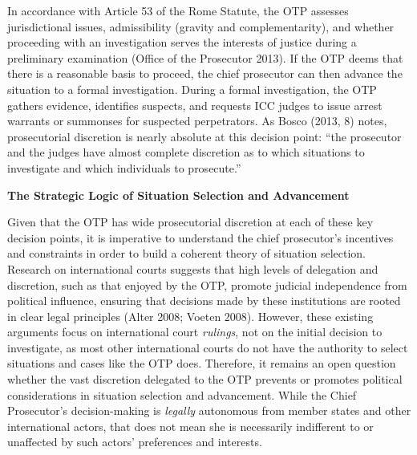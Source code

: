 In accordance with Article 53 of the Rome Statute, the OTP assesses jurisdictional issues, admissibility (gravity and complementarity), and whether proceeding with an investigation serves the interests of justice during a preliminary examination (Office of the Prosecutor 2013). If the OTP deems that there is a reasonable basis to proceed, the chief prosecutor can then advance the situation to a formal investigation. During a formal investigation, the OTP gathers evidence, identifies suspects, and requests ICC judges to issue arrest warrants or summonses for suspected perpetrators. As Bosco (2013, 8) notes, prosecutorial discretion is nearly absolute at this decision point: ``the prosecutor and the judges have almost complete discretion as to which situations to investigate and which individuals to prosecute.''

\textbf{The Strategic Logic of Situation Selection and Advancement}

Given that the OTP has wide prosecutorial discretion at each of these key decision points, it is imperative to understand the chief prosecutor's incentives and constraints in order to build a coherent theory of situation selection. Research on international courts suggests that high levels of delegation and discretion, such as that enjoyed by the OTP, promote judicial independence from political influence, ensuring that decisions made by these institutions are rooted in clear legal principles (Alter 2008; Voeten 2008). However, these existing arguments focus on international court \emph{rulings}, not on the initial decision to investigate, as most other international courts do not have the authority to select situations and cases like the OTP does. Therefore, it remains an open question whether the vast discretion delegated to the OTP prevents or promotes political considerations in situation selection and advancement. While the Chief Prosecutor's decision-making is \emph{legally} autonomous from member states and other international actors, that does not mean she is necessarily indifferent to or unaffected by such actors' preferences and interests.


